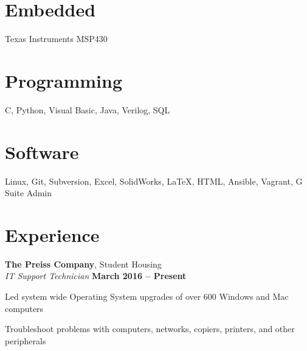 \documentclass[margin,line]{resume}
\begin{document}
\address{1822 Birmingham Ave. Durham, NC 27704
	\hspace{7mm}
	\Mobilefone \hspace{1mm}(704) 799-5153
	\hspace{7mm}
	\Letter \hspace{.1mm}
	\href{mailto:jesseaster1@gmail.com}{jesseaster1@gmail.com}
}


\begin{resume}

   
    \section{\mysidestyle Embedded}
    Texas Instruments MSP430
    \vspace{-5mm}
    
    \section{\mysidestyle Programming}
    C, Python, Visual Basic, Java, Verilog, SQL
    \vspace{-5mm}

    \section{\mysidestyle Software}
    Linux, Git, Subversion, Excel, SolidWorks, \LaTeX, HTML, Ansible, Vagrant, G Suite Admin

    \section{\mysidestyle Experience}


    \textbf{The Preiss Company}, Student Housing\\
    \textsl{IT Support Technician}  \hfill \textbf{March 2016 -- Present}\\
    \vspace{-4mm}
    \begin{list2}
    \item Led system wide Operating System upgrades of over 600 Windows and Mac computers
    \item Troubleshoot problems with computers, networks, copiers, printers, and other peripherals


\end{list2}
\end{resume}
\end{document}
